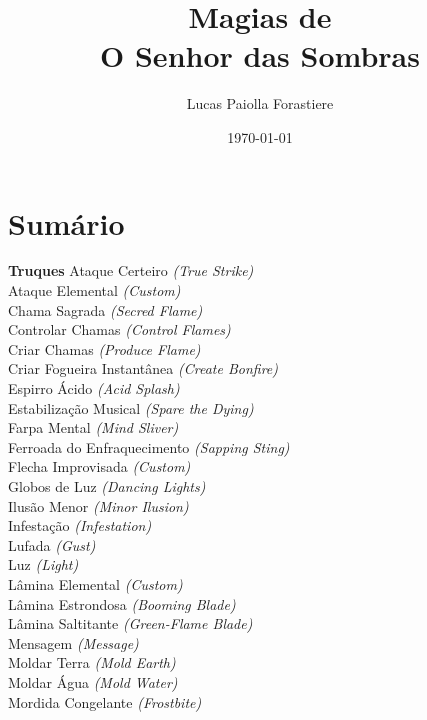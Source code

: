 \documentclass{RPG_Adventure}[2021/10/20]
\title{Magias de\\ \Huge{O Senhor das Sombras}}
\date{\today}
\author{Lucas Paiolla Forastiere}
\begin{document}
\maketitle

\chapter{Sumário}\n\n\noindent\textbf{Truques}
{\normalsize Ataque Certeiro \textit{(True Strike)}\\ }
{\normalsize Ataque Elemental \textit{(Custom)}\\ }
{\normalsize Chama Sagrada \textit{(Secred Flame)}\\ }
{\normalsize Controlar Chamas \textit{(Control Flames)}\\ }
{\normalsize Criar Chamas \textit{(Produce Flame)}\\ }
{\normalsize Criar Fogueira Instantânea \textit{(Create Bonfire)}\\ }
{\normalsize Espirro Ácido \textit{(Acid Splash)}\\ }
{\normalsize Estabilização Musical \textit{(Spare the Dying)}\\ }
{\normalsize Farpa Mental \textit{(Mind Sliver)}\\ }
{\normalsize Ferroada do Enfraquecimento \textit{(Sapping Sting)}\\ }
{\normalsize Flecha Improvisada \textit{(Custom)}\\ }
{\normalsize Globos de Luz \textit{(Dancing Lights)}\\ }
{\normalsize Ilusão Menor \textit{(Minor Ilusion)}\\ }
{\normalsize Infestação \textit{(Infestation)}\\ }
{\normalsize Lufada \textit{(Gust)}\\ }
{\normalsize Luz \textit{(Light)}\\ }
{\normalsize Lâmina Elemental \textit{(Custom)}\\ }
{\normalsize Lâmina Estrondosa \textit{(Booming Blade)}\\ }
{\normalsize Lâmina Saltitante \textit{(Green-Flame Blade)}\\ }
{\normalsize Mensagem \textit{(Message)}\\ }
{\normalsize Moldar Terra \textit{(Mold Earth)}\\ }
{\normalsize Moldar Água \textit{(Mold Water)}\\ }
{\normalsize Mordida Congelante \textit{(Frostbite)}\\ }
\end{document}
